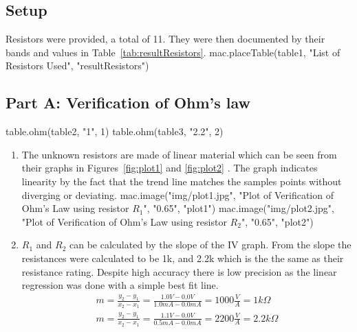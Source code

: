 {%
{%

{%
{%
{%
{%
{%

\subsection{Setup}
\label{sub:Setup}
Resistors were provided, a total of 11. They were then documented by
their bands and values in Table~\ref{tab:resultResistors}.
{{ mac.placeTable(table1, "List of Resistors Used", "resultResistors")}}


\subsection{Part A: Verification of Ohm’s law}
\label{sub:Part A}
{{ table.ohm(table2, "1", 1)}}
{{ table.ohm(table3, "2.2", 2)}}
\begin{enumerate}
  \item The unknown resistors are made of linear material which can be seen from their graphs in Figures~\ref{fig:plot1} and \ref{fig:plot2} .
  The graph indicates linearity by the fact that the trend line matches the
  samples points without diverging or deviating.
  {{ mac.image("img/plot1.jpg", "Plot of Verification of Ohm's Law using resistor $R_1$", "0.65", "plot1")}}
  {{ mac.image("img/plot2.jpg", "Plot of Verification of Ohm's Law using resistor $R_2$", "0.65", "plot2")}}
  \item $R_1$ and $R_2$ can be calculated by the slope of the IV graph.
  From the slope the resistances were calculated to be 1k, and 2.2k which is the
  the same as their resistance rating. Despite high accuracy there is low precision as
  the linear regression was done with a simple best fit line.
  \begin{gather}
    m = \frac{y_2-y_1}{x_2-x_1} = \frac{1.0 V - 0.0 V}{1.0 mA - 0.0 mA} = 1000 \frac{V}{A} = 1 k \Omega \\
    m = \frac{y_2-y_1}{x_2-x_1} = \frac{1.1 V - 0.0 V}{0.5 mA - 0.0 mA} = 2200 \frac{V}{A} = 2.2 k \Omega
  \end{gather}
\end{enumerate}

\vspace{1cm}

}}}}}}}
